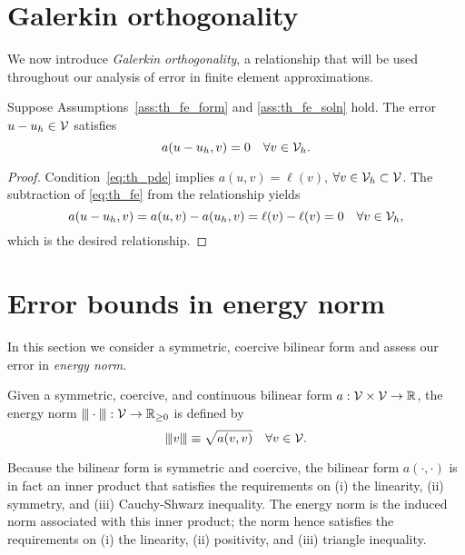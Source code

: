 \section{Galerkin orthogonality}
We now introduce \emph{Galerkin orthogonality}, a relationship that will be used throughout our analysis of error in finite element approximations.
\begin{lemma}
  Suppose Assumptions~\ref{ass:th_fe_form} and \ref{ass:th_fe_soln} hold. The error $u - u_h \in \mathcal{V}$ satisfies 
  \begin{equation*}
    a(u - u_h, v) = 0 \quad \forall v \in \mathcal{V}_h.
  \end{equation*}
  \begin{proof}
    Condition~\eqref{eq:th_pde} implies $a(u,v) = \ell(v)$, $\forall v \in \mathcal{V}_h \subset \mathcal{V}$.  The subtraction of \eqref{eq:th_fe} from the relationship yields
    \begin{equation*}
      a(u - u_h, v) = a(u,v) - a(u_h,v) = \ell(v) - \ell(v) = 0 \quad \forall v \in \mathcal{V}_h,
    \end{equation*}
    which is the desired relationship.
  \end{proof}
\end{lemma}

\section{Error bounds in energy norm}
In this section we consider a symmetric, coercive bilinear form and assess our error in \emph{energy norm}.
\begin{definition}
  Given a symmetric, coercive, and continuous bilinear form $a: \mathcal{V} \times \mathcal{V} \to \mathbb{R}$, the energy norm $|\kern-1pt|\kern-1pt| \cdot |\kern-1pt|\kern-1pt| : \mathcal{V} \to \mathbb{R}_{\geq 0}$ is defined by
  \begin{equation*}
    |\kern-1pt|\kern-1pt| v |\kern-1pt|\kern-1pt| \equiv \sqrt{a(v,v)} \quad \forall v \in \mathcal{V}.
  \end{equation*}
\end{definition}
Because the bilinear form is symmetric and coercive, the bilinear form $a(\cdot,\cdot)$ is in fact an inner product that satisfies the requirements on (i) the linearity, (ii) symmetry, and (iii) Cauchy-Shwarz inequality.  The energy norm is the induced norm associated with this inner product; the norm hence satisfies the requirements on (i) the linearity, (ii) positivity, and (iii) triangle inequality.

